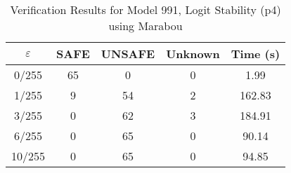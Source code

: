 \begin{table}[htbp]
\centering
\caption{Verification Results for Model 991, Logit Stability (p4) using Marabou}
\label{tab:model991_p4_marabou}
\begin{tabular}{|c|c|c|c|c|}
\hline
$\varepsilon$ & SAFE & UNSAFE & Unknown & Time (s) \\ \hline
0/255 & 65 & 0 & 0 & 1.99 \\ \hline
1/255 & 9 & 54 & 2 & 162.83 \\ \hline
3/255 & 0 & 62 & 3 & 184.91 \\ \hline
6/255 & 0 & 65 & 0 & 90.14 \\ \hline
10/255 & 0 & 65 & 0 & 94.85 \\ \hline
\end{tabular}
\end{table}
